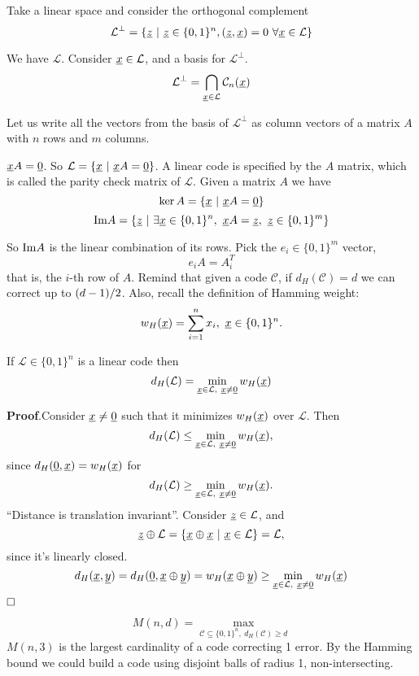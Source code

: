 Take a linear space and consider the orthogonal complement
\[
\mathcal{L}^\perp = \{\underline{z}\ |\ \underline{z} \in \{0, 1\}^n, (\underline{z}, \underline{x}) = 0\ \forall \underline{x} \in \mathcal{L}\}
\]

We have $\mathcal{L}$. Consider $\underline{x} \in \mathcal{L}$, and a basis for $\mathcal{L}^\perp$.
\[
\mathcal{L}^\perp = \bigcap_{\underline{x} \in \mathcal{L}}\mathcal{C}_n(\underline{x})
\]

Let us write all the vectors from the basis of $\mathcal{L}^\perp$ as column vectors of a matrix $A$ with $n$ rows and $m$ columns.

$\underline{x}A = \underline{0}$. So $\mathcal{L} = \{\underline{x}\ |\ \underline{x}A = \underline{0}\}$. A linear code is specified by the $A$ matrix, which is called the parity check matrix of $\mathcal{L}$. Given a matrix $A$ we have
\[
\ker A = \{\underline{x}\ |\ \underline{x}A = \underline{0} \}
\]
\[
\im A = \{\str{z}\ |\ \exists \str{x} \in \{0, 1\}^n,\ \str{x}A = \str{z},\ \str{z} \in \{0, 1\}^m\}
\]

So $\text{Im} A$ is the linear combination of its rows. Pick the $e_i \in \{0, 1\}^m$ vector, 
\[
e_iA = A_i^T
\]
that is, the $i$-th row of $A$. Remind that given a code $\mathcal{C}$, if $d_H(\mathcal{C}) = d$ we can correct up to ${(d-1)}/{2}$. Also, recall the definition of Hamming weight:
\[
w_H(\underline{x}) = \sum_{i = 1}^n x_i,\ \underline{x} \in \{0, 1\}^n.
\]

\begin{obs}
	If $\mathcal{L} \in \{0, 1\}^n$ is a linear code then
	$$d_H(\mathcal{L}) = \min_{\underline{x} \in \mathcal{L},\ \underline{x} \not= \underline{0}}w_H(\underline{x})$$
\end{obs}

\noindent\textbf{Proof}.Consider $\underline{x} \not= \underline{0}$ such that it minimizes $w_H(\underline{x})$ over $\mathcal{L}$. Then $$d_H(\mathcal{L}) \leq \min_{\underline{x} \in \mathcal{L},\ \underline{x}\not= \underline{0}}w_H(\underline{x}),$$ since $d_H(\underline{0}, \underline{x}) = w_H(\underline{x})$ for $$d_H(\mathcal{L}) \geq \min_{\underline{x} \in \mathcal{L},\ \underline{x}\not= \underline{0}}w_H(\underline{x}).$$ ``Distance is translation invariant''. Consider $\underline{z} \in \mathcal{L}$, and $$\underline{z} \oplus \mathcal{L} = \{\underline{x} \oplus \underline{x}\ |\ \underline{x}\in \mathcal{L} \} = \mathcal{L},$$ since it's linearly closed.
\[
d_H(\underline{x}, \underline{y}) = d_H(\underline{0}, \underline{x} \oplus \underline{y}) = w_H(\underline{x}\oplus\underline{y}) \geq \min_{\underline{x} \in \mathcal{L},\ \underline{x} \not= \underline{0}} w_H(\underline{x})
\]
$\hfill\Box$

\[
M(n, d) = \max_{\mathcal{C} \subseteq \{0, 1\}^n,\ d_H(\mathcal{C}) \geq d}
\]
$M(n, 3)$ is the largest cardinality of a code correcting 1 error. By the Hamming bound we could build a code using disjoint balls of radius 1, non-intersecting.

